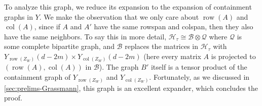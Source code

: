 \documentclass[10pt,a4paper]{article}
\newcommand{\prettyref}[1]{\cref{#1}}
\newtheorem{lemma}[theorem]{Lemma}
\theoremstyle{definition}
\theoremstyle{remark}
\DeclareMathOperator{\row}{row}
\DeclareMathOperator{\col}{col}
\renewcommand{\leq}{\leqslant}
\renewcommand{\geq}{\geqslant}
\numberwithin{equation}{section}
\let\origparagraph\paragraph
\renewcommand{\paragraph}[1]{\origparagraph{#1.}}
\let\pref=\prettyref
\def\Y{Y}
\def\B{\mathcal{H}}
\def\diml{d}
\def\dimlin{{\diml}}
\def\dimlout{\diml'}
\def\lambdao{\lambda'}
\def\dimm{\ell}
\def\Stwo{\mathcal{S}}
\begin{document}
To analyze this graph, we reduce its expansion to the expansion of containment graphs in \(\Y\). We make the observation that we only care about \(\row(A)\) and \(\col(A)\), since if \(A\) and \(A'\) have the same rowspan and colspan, then they also have the same neighbors. To say this in more detail, \(\B_\tau \cong \mathcal{B} \otimes \mathcal{Q}\) where \(\mathcal{Q}\) is some complete bipartite graph, and \(\mathcal{B}\) replaces the matrices in \(\B_\tau\) with \(\Y_{\row(Z_W)}(\dimlin-2m) \times \Y_{\col(Z_W)}(\dimlin-2m)\) (here every matrix \(A\) is projected to \((\row(A),\col(A))\) in \(\mathcal{B}\)).
%
The graph \(B'\) itself is a tensor product of the containment graph of \(Y_{\row(Z_W)}\) and \(Y_{\col(Z_W)}\). Fortunately, as we discussed in \pref{sec:prelims-Grassmann}, this graph is an excellent expander, which concludes the proof.

\end{document}
